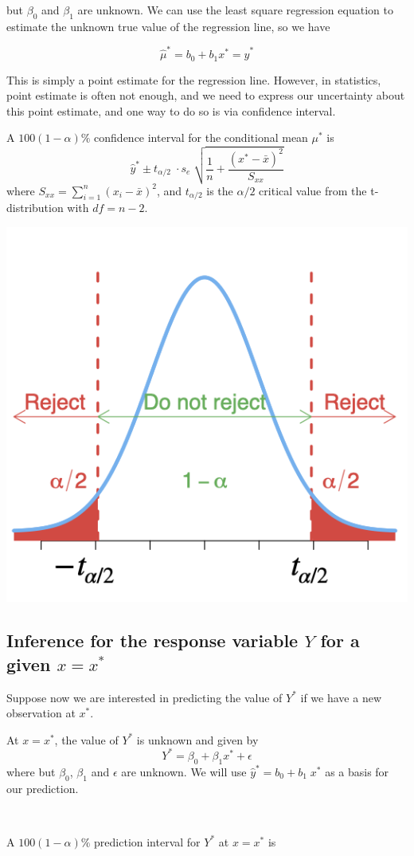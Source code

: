 \documentclass[
]{article}
\begin{document}
but \(\beta_0\) and \(\beta_1\) are unknown. We can use the least square
regression equation to estimate the unknown true value of the regression
line, so we have

\[\hat{\mu}^*=b_0+b_1 x^*=\hat{y}^*\]

This is simply a point estimate for the regression line. However, in
statistics, point estimate is often not enough, and we need to express
our uncertainty about this point estimate, and one way to do so is via
confidence interval.

A \(100(1-\alpha)\%\) confidence interval for the conditional mean
\(\mu^*\) is
\[\hat{y}^*\pm t_{\alpha/2}\;\cdot s_e\;\sqrt{\frac{1}{n}+\frac{(x^*-\bar{x})^2}{S_{xx}}}\]
where \(S_{xx}=\sum_{i=1}^{n} (x_i-\bar{x})^2\), and \(t_{\alpha/2}\) is
the \(\alpha/2\) critical value from the t-distribution with \(df=n-2\).

\begin{center}\includegraphics[width=0.35\linewidth,height=0.35\textheight]{figures/Ttest2} \end{center}

\hypertarget{inference-for-the-response-variable-y-for-a-given-xx}{%
\subsection{\texorpdfstring{Inference for the response variable \(Y\)
for a given
\(x=x^*\)}{Inference for the response variable Y for a given x=x\^{}*}}\label{inference-for-the-response-variable-y-for-a-given-xx}}

Suppose now we are interested in predicting the value of \(Y^*\) if we
have a new observation at \(x^*\).

At \(x=x^*\), the value of \(Y^*\) is unknown and given by
\[Y^*=\beta_0+\beta_1 x^*+\epsilon\] where but \(\beta_0\), \(\beta_1\)
and \(\epsilon\) are unknown. We will use \(\hat{y}^*=b_0+b_1\;x^*\) as
a basis for our prediction.

\(~\)

A \(100(1-\alpha)\%\) prediction interval for \(Y^*\) at \(x=x^*\) is
\end{document}
